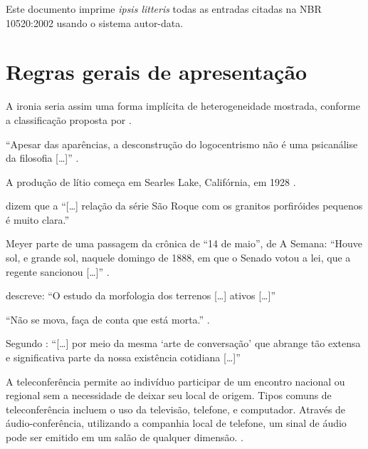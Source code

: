 \documentclass[a4paper]{article}
\title{NBR 10520:2002 - \iftoggle{reference}{Referência}{Teste}}
\author{Daniel Ballester Marques}
\begin{document}
\frenchspacing

\maketitle

Este documento imprime \textit{ipsis litteris} todas as entradas citadas na
NBR 10520:2002 usando o sistema autor-data.

\tableofcontents

\clearpage

\setcounter{section}{5}

\section{Regras gerais de apresentação}

A ironia seria assim uma forma implícita de heterogeneidade mostrada, conforme
a classificação proposta por \textcite{authier1982}.

\enquote{Apesar das aparências, a desconstrução do logocentrismo não é uma
psicanálise da filosofia [\ldots]} \cite[293]{derrida1967}.

A produção de lítio começa em Searles Lake, Califórnia, em 1928
\cite[513]{mumford1949}.

\textcite[146]{oliveira1943} dizem que a \enquote{[\ldots] relação da série
São Roque com os granitos porfiróides pequenos é muito clara.}

Meyer parte de uma passagem da crônica de \enquote{14 de maio}, de A Semana:
\enquote{Houve sol, e grande sol, naquele domingo de 1888, em que o Senado
votou a lei, que a regente sancionou [\ldots]} \cite[v. 3, p. 583]{assis1994}.

\textcite[35]{barbour1971} descreve: \enquote{O estudo da morfologia dos
terrenos [\ldots] ativos [\ldots]}

\enquote{Não se mova, faça de conta que está morta.} \cite[72]{clarac1985}.

Segundo \textcite[27]{sa1995}: \enquote{[\ldots] por meio da mesma \enquote{arte de
conversação} que abrange tão extensa e significativa parte da nossa existência
cotidiana [\ldots]}

A teleconferência permite ao indivíduo participar de um encontro nacional ou
regional sem a necessidade de deixar seu local de origem. Tipos comuns de
teleconferência incluem o uso da televisão, telefone, e computador. Através de
áudio-conferência, utilizando a companhia local de telefone, um sinal de áudio
pode ser emitido em um salão de qualquer dimensão. \cite[181]{nichols1993}.
\end{document}
